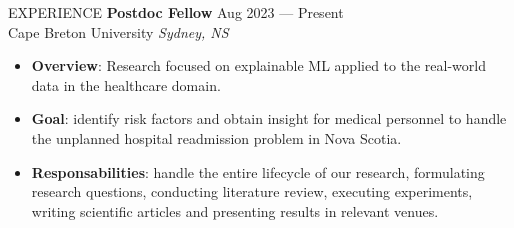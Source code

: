 \documentclass{resume} %
\begin{document}
\vspace{-0.1cm}
\begin{rSection}{EXPERIENCE}
\textbf{Postdoc Fellow  } \hfill Aug 2023 --- Present\\Cape Breton University \hfill \textit{Sydney, NS}\\
\vspace{-0.7cm}

\begin{itemize}
    \item \textbf{Overview}: Research focused on explainable ML applied to the real-world data in the healthcare domain.
    \vspace{-0.25cm}
    \item \textbf{Goal}: identify risk factors and obtain insight for medical personnel to handle the unplanned hospital readmission problem in Nova Scotia.
    \vspace{-0.25cm} 
    \item \textbf{Responsabilities}: handle the entire lifecycle of our research, formulating research questions, conducting literature review, executing experiments, writing scientific articles and presenting results in relevant venues.
\end{itemize}


\end{rSection}
\end{document}

